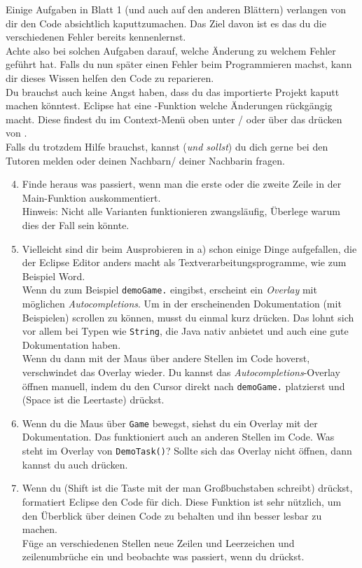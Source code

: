 \begin{Infobox}[Fehler]
    Einige Aufgaben in Blatt 1 (und auch auf den anderen Blättern) verlangen von dir den Code absichtlich kaputtzumachen.
    Das Ziel davon ist es das du die verschiedenen Fehler bereits kennenlernst.\\
    Achte also bei solchen Aufgaben darauf, welche Änderung zu welchem Fehler geführt hat.
    Falls du nun später einen Fehler beim Programmieren machst, kann dir dieses Wissen helfen den Code zu reparieren.\\
    Du brauchst auch keine Angst haben, dass du das importierte Projekt kaputt machen könntest.
    Eclipse hat eine -Funktion welche Änderungen rückgängig macht.
    Diese findest du im Context-Menü oben unter / oder über das drücken von .\\
    Falls du trotzdem Hilfe brauchst, kannst (\emph{und sollst}) du dich gerne bei den Tutoren melden oder deinen Nachbarn/ deiner Nachbarin fragen.
\end{Infobox}


\begin{enumerate}
	\setcounter{enumi}{3}
	\item Finde heraus was passiert, wenn man die erste oder die zweite Zeile in der Main-Funktion auskommentiert.\\
	Hinweis: Nicht alle Varianten funktionieren zwangsläufig, Überlege warum dies der Fall sein könnte.
	\item Vielleicht sind dir beim Ausprobieren in a) schon einige Dinge aufgefallen, die der Eclipse Editor anders macht als Textverarbeitungsprogramme, wie zum Beispiel Word.\\\label{ex1e}
	Wenn du zum Beispiel \lstinline{demoGame.} eingibst, erscheint ein \textit{Overlay} mit möglichen \textit{Autocompletions}. Um in der erscheinenden Dokumentation (mit Beispielen) scrollen zu können, musst du einmal kurz  drücken. Das lohnt sich vor allem bei Typen wie \lstinline{String}, die Java nativ anbietet und auch eine gute Dokumentation haben.\\
	Wenn du dann mit der Maus über andere Stellen im Code hoverst, verschwindet das Overlay wieder.
	Du kannst das \textit{Autocompletions}-Overlay öffnen manuell, indem du den Cursor direkt nach \lstinline{demoGame.} platzierst und  (Space ist die Leertaste) drückst.
	\item
	Wenn du die Maus über \lstinline{Game} bewegst, siehst du ein Overlay mit der Dokumentation.
	Das funktioniert auch an anderen Stellen im Code.
	Was steht im Overlay von \lstinline{DemoTask()}? Sollte sich das Overlay nicht öffnen, dann kannst du auch  drücken.
	\item
	Wenn du  (Shift ist die Taste mit der man Großbuchstaben schreibt) drückst, formatiert Eclipse den Code für dich. Diese Funktion ist sehr nützlich, um den Überblick über deinen Code zu behalten und ihn besser lesbar zu machen.\\
	Füge an verschiedenen Stellen neue Zeilen und Leerzeichen und zeilenumbrüche ein und beobachte was passiert, wenn du  drückst.
\end{enumerate}


